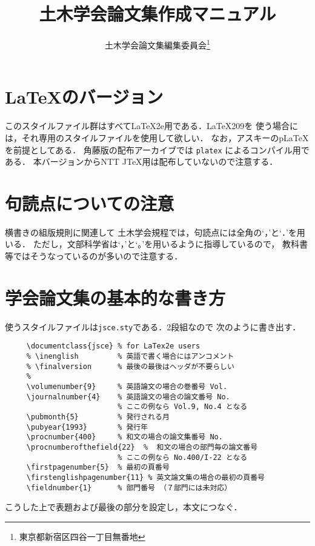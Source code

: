 \documentclass[onecolumn]{jsce}  %
\title{土木学会論文集作成マニュアル}
\author{土木学会論文集編集委員会\thanks{東京都新宿区四谷一丁目無番地}}
\begin{document}
\maketitle

\tableofcontents

\section{\LaTeX のバージョン}

このスタイルファイル群はすべて\LaTeX 2e用である．\LaTeX 209を
使う場合には，それ専用のスタイルファイルを使用して欲しい．
なお，アスキーのp\LaTeX を前提としてある．
角藤版の配布アーカイブでは \verb+platex+ によるコンパイル用である．
本バージョンからNTT J\TeX 用は配布していないので注意する．

\section{句読点についての注意}
\label{sec:1}

横書きの組版規則に関連して
土木学会規程では，句読点には全角の`，'と`．'を用いる．
ただし，文部科学省は`，'と`。'を用いるように指導しているので，
教科書等ではそうなっているのが多いので注意する．

\section{学会論文集の基本的な書き方}

使うスタイルファイルは{\tt jsce.sty}である．2段組なので
次のように書き出す．

\renewcommand{\baselinestretch}{0.75}\small\normalsize
\begin{verbatim}
     \documentclass{jsce} % for LaTex2e users
     % \inenglish         % 英語で書く場合にはアンコメント
     % \finalversion      % 最後の最後はヘッダが不要らしい
     %
     \volumenumber{9}     % 英語論文の場合の巻番号 Vol. 
     \journalnumber{4}    % 英語論文の場合の論文番号 No.
                          % ここの例なら Vol.9, No.4 となる
     \pubmonth{5}         % 発行される月
     \pubyear{1993}       % 発行年
     \procnumber{400}     % 和文の場合の論文集番号 No.
     \procnumberofthefield{22}  %  和文の場合の部門毎の論文番号
                          % ここの例なら No.400/I-22 となる
     \firstpagenumber{5}  % 最初の頁番号
     \firstenglishpagenumber{11} % 英文論文集の場合の最初の頁番号
     \fieldnumber{1}      % 部門番号 （７部門には未対応）
\end{verbatim}
\renewcommand{\baselinestretch}{1}\small\normalsize
こうした上で表題および最後の部分を設定し，本文につなぐ．
\end{document}
